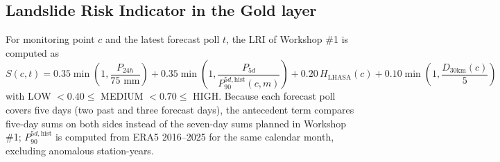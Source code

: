 \documentclass[11pt,a4paper]{article}
\begin{document}
\subsection{Landslide Risk Indicator in the Gold layer}
For monitoring point $c$ and the latest forecast poll $t$, the LRI of Workshop \#1 is computed as
\begin{equation}
S(c,t) = 0.35\min\!\left(1,\frac{P_{24h}}{75\text{ mm}}\right) + 0.35\min\!\left(1,\frac{P_{5d}}{P^{5d,\text{hist}}_{90}(c,m)}\right)
+ 0.20\,H_{\text{LHASA}}(c) + 0.10\min\!\left(1,\frac{D_{30\text{km}}(c)}{5}\right)
\end{equation}
with LOW $<0.40\le$ MEDIUM $<0.70\le$ HIGH. Because each forecast poll covers five days (two past and three forecast
days), the antecedent term compares five-day sums on both sides instead of the seven-day sums planned in Workshop \#1;
$P^{5d,\text{hist}}_{90}$ is computed from ERA5 2016--2025 for the same calendar month, excluding anomalous station-years.
\end{document}
